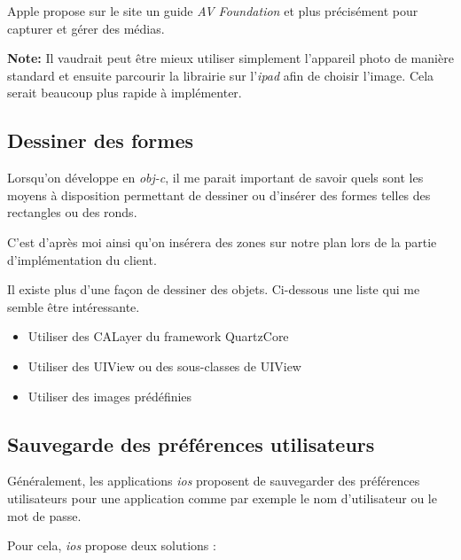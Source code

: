\medskip

Apple propose sur le site \cite{online:avfoundation} un guide \emph{AV Foundation} et plus précisément pour capturer et gérer des médias.

\medskip

{\bf Note:} Il vaudrait peut être mieux utiliser simplement l'appareil photo de manière standard et ensuite parcourir la librairie sur l'\emph{\gls{ipad}} afin de choisir l'image. Cela serait beaucoup plus rapide à implémenter.
  

\subsection{Dessiner des formes} %
\label{sub:dessiner_des_formes}

Lorsqu'on développe en \emph{\gls{obj-c}}, il me parait important de savoir quels sont les moyens à disposition permettant de dessiner ou d'insérer des formes telles des rectangles ou des ronds.

\medskip

C'est d'après moi ainsi qu'on insérera des zones sur notre plan lors de la partie d'implémentation du client.

\medskip

Il existe plus d'une façon de dessiner des objets. Ci-dessous une liste qui me semble être intéressante.

\medskip

\begin{itemize}
  \item Utiliser des CALayer du framework QuartzCore
  \item Utiliser des UIView ou des sous-classes de UIView
  \item Utiliser des images prédéfinies
\end{itemize}

\subsection{Sauvegarde des préférences utilisateurs} %
\label{sub:sauvegarde_des_pr_f_rences_utilisateurs}
Généralement, les applications \emph{\gls{ios}} proposent de sauvegarder des préférences utilisateurs pour une application comme par exemple le nom d'utilisateur ou le mot de passe.

\medskip

Pour cela, \emph{\gls{ios}} propose deux solutions : 

